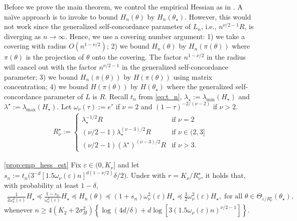 Before we prove the main theorem, we control the empirical Hessian as in .
A na\"ive approach is to invoke  to bound $H_n(\theta)$ by $H_n(\theta_\star)$.
However, this would not work since the generalized self-concordance parameter of $L_n$, i.e., $n^{\nu/2-1} R$, is diverging as $n \rightarrow \infty$.
Hence, we use a covering number argument: 1) we take a covering with radius $O(n^{1-\nu/2})$; 2) we bound $H_n(\theta)$ by $H_n(\pi(\theta))$ where $\pi(\theta)$ is the projection of $\theta$ onto the covering. The factor $n^{1-\nu/2}$ in the radius will cancel out with the factor $n^{\nu/2-1}$ in the generalized self-concordance parameter; 3) we bound $H_n(\pi(\theta))$ by $H(\pi(\theta))$ using matrix concentration; 4) we bound $H(\pi(\theta))$ by $H(\theta_\star)$ where the generalized self-concordance parameter of $L$ is $R$.
Recall $t_n$ from \eqref{eq:t_n}, $\lambda_\star := \lambda_{\min}(H_\star)$ and $\lambda^\star := \lambda_{\max}(H_\star)$.
Let $\omega_\nu(\tau) := e^{\tau}$ if $\nu = 2$ and $(1 - \tau)^{-2/(\nu-2)}$ if $\nu > 2$.
\begin{align}\label{eq:R_nu_star}
    R_{\nu}^\star :=
    \begin{cases}
        \lambda_{\star}^{-1/2} R & \mbox{if } \nu = 2 \\
        (\nu/2 -1) \lambda_{\star}^{(\nu - 3)/2} R & \mbox{if } \nu \in (2, 3] \\
        (\nu/2 - 1) (\lambda^\star)^{(\nu - 3)/2} R & \mbox{if } \nu > 3.
    \end{cases}
\end{align}

\begin{customprop}{\ref{prop:emp_hess_est}}
    Fix $\varepsilon \in (0, K_\nu]$ and let $s_n := t_n\big( 3^{-d}[1.5 \omega_\nu(\varepsilon) n]^{d(1-\nu/2)} \delta/2 \big)$.
    Under  with $r = K_\nu  / R_\nu^\star$, it holds that, with probability at least $1 - \delta$,
    \begin{align*}
        \frac1{2\omega_\nu^2(\varepsilon)} H_\star \preceq \frac{1-s_n}{\omega_\nu^2(\varepsilon)} H_\star \preceq H_n(\theta) \preceq (1 + s_n) \omega_\nu^2(\varepsilon) H_\star \preceq \frac32 \omega_\nu^2(\varepsilon) H_\star, \;\mbox{for all } \theta \in \Theta_{\varepsilon/R_\nu^\star}(\theta_\star),
    \end{align*}
    whenever $n \ge 4(K_2 + 2\sigma_H^2) \left\{ \log{(4d/\delta)} + d \log{[3(1.5 \omega_\nu(\varepsilon)n)^{\nu/2-1}]}\right\}$.
\end{customprop}


